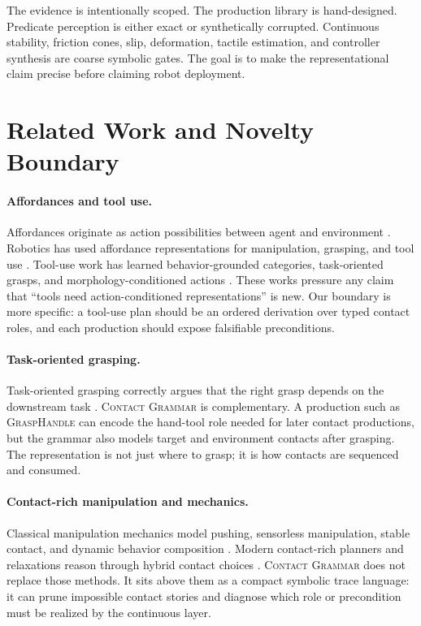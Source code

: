 \documentclass{article}
\newcommand{\CG}{\textsc{Contact Grammar}}
\begin{document}
The evidence is intentionally scoped. The production library is hand-designed. Predicate perception is either exact or synthetically corrupted. Continuous stability, friction cones, slip, deformation, tactile estimation, and controller synthesis are coarse symbolic gates. The goal is to make the representational claim precise before claiming robot deployment.

\section{Related Work and Novelty Boundary}

\paragraph{Affordances and tool use.}
Affordances originate as action possibilities between agent and environment \citep{gibson1979ecological}. Robotics has used affordance representations for manipulation, grasping, and tool use \citep{stoytchev2005tool,sinapov2007tool,yamanobe2017affordance,ardon2021affordance}. Tool-use work has learned behavior-grounded categories, task-oriented grasps, and morphology-conditioned actions \citep{fang2018tog,shao2020tools,qinsurvey2023,yang2024granularity}. These works pressure any claim that ``tools need action-conditioned representations'' is new. Our boundary is more specific: a tool-use plan should be an ordered derivation over typed contact roles, and each production should expose falsifiable preconditions.

\paragraph{Task-oriented grasping.}
Task-oriented grasping correctly argues that the right grasp depends on the downstream task \citep{kokic2017affordance,fang2018tog}. \CG{} is complementary. A production such as \textsc{GraspHandle} can encode the hand-tool role needed for later contact productions, but the grammar also models target and environment contacts after grasping. The representation is not just where to grasp; it is how contacts are sequenced and consumed.

\paragraph{Contact-rich manipulation and mechanics.}
Classical manipulation mechanics model pushing, sensorless manipulation, stable contact, and dynamic behavior composition \citep{mason1986pushing,erdmann1988sensorless,lynch1996stable,burridge1999sequential}. Modern contact-rich planners and relaxations reason through hybrid contact choices \citep{toussaint2015logic,graesdal2024convex}. \CG{} does not replace those methods. It sits above them as a compact symbolic trace language: it can prune impossible contact stories and diagnose which role or precondition must be realized by the continuous layer.
\end{document}
